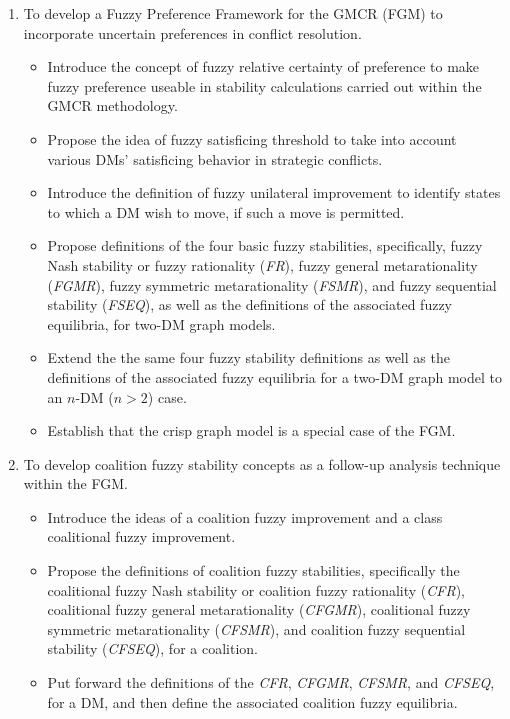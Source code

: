 \begin{enumerate}
  \item To develop a Fuzzy Preference Framework for the GMCR (FGM) to incorporate uncertain preferences in conflict resolution.
    \begin{itemize}
      \item Introduce the concept of fuzzy relative certainty of preference to make fuzzy preference useable in stability calculations carried out within the GMCR methodology.
      \item Propose the idea of fuzzy satisficing threshold to take into account various DMs' satisficing behavior in strategic conflicts.
      \item Introduce the definition of fuzzy unilateral improvement to identify states to which a DM wish to move, if such a move is permitted.
      \item Propose definitions of the four basic fuzzy stabilities, specifically, fuzzy Nash stability or fuzzy rationality (\emph{FR}), fuzzy general metarationality (\emph{FGMR}), fuzzy symmetric metarationality (\emph{FSMR}), and fuzzy sequential stability (\emph{FSEQ}), as well as the definitions of the associated fuzzy equilibria, for two-DM graph models.
      \item Extend the the same four fuzzy stability definitions as well as the definitions of the associated fuzzy equilibria for a two-DM graph model to an $n$-DM ($n>2$) case.
      \item Establish that the crisp graph model is a special case of the FGM.
    \end{itemize}

  \item To develop coalition fuzzy stability concepts as a follow-up analysis technique within the FGM.
    \begin{itemize}
      \item Introduce the ideas of a coalition fuzzy improvement and a class coalitional fuzzy improvement.
      \item Propose the definitions of coalition fuzzy stabilities, specifically the coalitional fuzzy Nash stability or coalition fuzzy rationality (\emph{CFR}), coalitional fuzzy general metarationality (\emph{CFGMR}), coalitional fuzzy symmetric metarationality (\emph{CFSMR}), and coalition fuzzy sequential stability (\emph{CFSEQ}), for a coalition.
      \item Put forward the definitions of the \emph{CFR}, \emph{CFGMR}, \emph{CFSMR}, and \emph{CFSEQ}, for a DM, and then define the associated coalition fuzzy equilibria.
    \end{itemize}


\end{enumerate}
